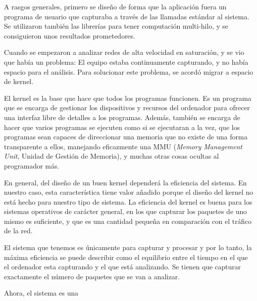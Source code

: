 A rasgos generales, primero se diseño de forma que la aplicación fuera un programa de usuario que capturaba a través de las llamadas estándar al sistema. Se utilizaron también las librerías para tener computación multi-hilo, y se consiguieron unos resultados prometedores.

Cuando se empezaron a analizar redes de alta velocidad en saturación, y se vio que había un problema: El equipo estaba continuamente capturando, y no había espacio para el análisis. Para solucionar este problema, se acordó migrar a espacio de kernel.

El kernel es la base que hace que todos los programas funcionen. Es un programa que se encarga de gestionar los dispositivos y recursos del ordenador para ofrecer una interfaz libre de detalles a los programas. Además, también se encarga de hacer que varios programas se ejecuten como si se ejecutaran a la vez, que los programas sean capaces de direccionar una memoria que no existe de una forma transparente a ellos, manejando eficazmente una MMU (\textit{Memory Management Unit}, Unidad de Gestión de Memoria), y muchas otras cosas ocultas al programador más.

En general, del diseño de un buen kernel dependerá la eficiencia del sistema. En nuestro caso, esta característica tiene valor añadido porque el diseño del kernel no está hecho para nuestro tipo de sistema. La eficiencia del kernel es buena para los sistemas operativos de carácter general, en los que capturar los paquetes de uno mismo es suficiente, y que es una cantidad pequeña en comparación con el tráfico de la red.

El sistema que tenemos es únicamente para capturar y procesar y por lo tanto, la máxima eficiencia se puede describir como el equilibrio entre el tiempo en el que el ordenador esta capturando y el que está analizando. Se tienen que capturar exactamente el número de paquetes que se van a analizar.

Ahora, el sistema es una